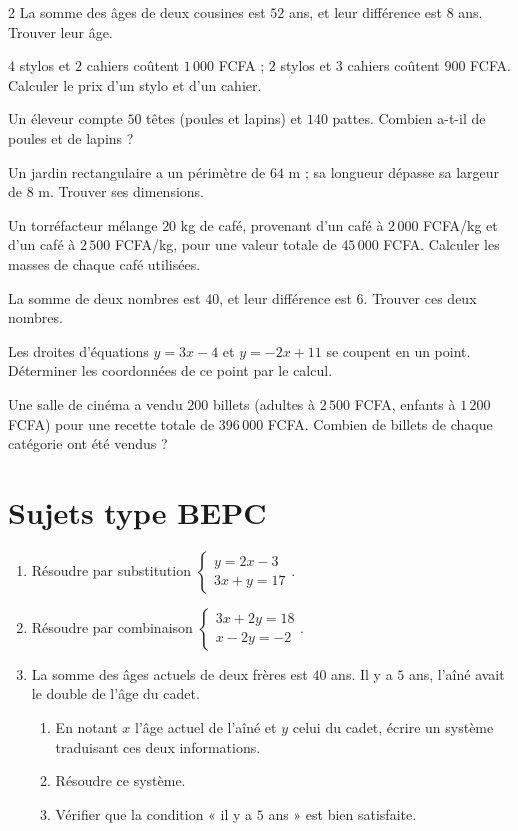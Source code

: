 \begin{multicols}{2}
\exo{} La somme des âges de deux cousines est $52$ ans, et leur différence est
$8$ ans. Trouver leur âge.

\exo{} $4$ stylos et $2$ cahiers coûtent $1\,000$ FCFA ; $2$ stylos et $3$ cahiers
coûtent $900$ FCFA. Calculer le prix d'un stylo et d'un cahier.

\exo{} Un éleveur compte $50$ têtes (poules et lapins) et $140$ pattes. Combien
a-t-il de poules et de lapins ?

\exo{} Un jardin rectangulaire a un périmètre de $64$ m ; sa longueur dépasse sa
largeur de $8$ m. Trouver ses dimensions.

\exo{} Un torréfacteur mélange $20$ kg de café, provenant d'un café à $2\,000$
FCFA/kg et d'un café à $2\,500$ FCFA/kg, pour une valeur totale de $45\,000$ FCFA. Calculer
les masses de chaque café utilisées.

\exo{} La somme de deux nombres est $40$, et leur différence est $6$. Trouver ces
deux nombres.

\exo{} Les droites d'équations $y=3x-4$ et $y=-2x+11$ se coupent en un point.
Déterminer les coordonnées de ce point par le calcul.

\exo{} Une salle de cinéma a vendu $200$ billets (adultes à $2\,500$ FCFA, enfants à
$1\,200$ FCFA) pour une recette totale de $396\,000$ FCFA. Combien de billets de chaque
catégorie ont été vendus ?

\end{multicols}

\section{Sujets type BEPC}

\begin{enumerate}[label=\arabic*)]
\item Résoudre par substitution $\left\{\begin{array}{l}y=2x-3\\3x+y=17\end{array}\right.$.
\item Résoudre par combinaison $\left\{\begin{array}{l}3x+2y=18\\x-2y=-2\end{array}\right.$.
\item La somme des âges actuels de deux frères est $40$ ans. Il y a $5$ ans, l'aîné avait le
double de l'âge du cadet.
\begin{enumerate}[label=\alph*)]
\item En notant $x$ l'âge actuel de l'aîné et $y$ celui du cadet, écrire un système
traduisant ces deux informations.
\item Résoudre ce système.
\item Vérifier que la condition « il y a $5$ ans » est bien satisfaite.
\end{enumerate}
\end{enumerate}

